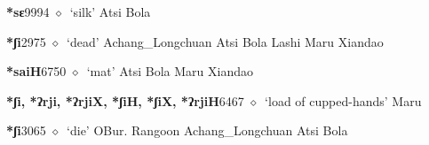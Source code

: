   \begin{list}{}{\leftmargin=1.5em \itemindent=-1.5em}
  \item {\footnotesize \textbf{*sɛ}}{\tiny 9994}
         $\diamond$~`silk'
         Atsi 
\hspace{1ex}
         Bola 
  \item {\footnotesize \textbf{*ʃi}}{\tiny 2975}
\hspace{1ex}
         $\diamond$~`dead'
         Achang\_Longchuan 
\hspace{1ex}
         Atsi 
\hspace{1ex}
         Bola 
\hspace{1ex}
         Lashi 
\hspace{1ex}
         Maru 
\hspace{1ex}
         Xiandao 
  \item {\footnotesize \textbf{*saiH}}{\tiny 6750}
\hspace{1ex}
         $\diamond$~`mat'
         Atsi 
\hspace{1ex}
         Bola 
\hspace{1ex}
         Maru 
\hspace{1ex}
         Xiandao 
  \item {\footnotesize \textbf{*ʃi, *ʔrji, *ʔrjiX, *ʃiH, *ʃiX, *ʔrjiH}}{\tiny 6467}
\hspace{1ex}
         $\diamond$~`load of cupped-hands'
         Maru 
  \item {\footnotesize \textbf{*ʃi}}{\tiny 3065}
\hspace{1ex}
         $\diamond$~`die'
         OBur. 
\hspace{1ex}
         Rangoon 
\hspace{1ex}
         Achang\_Longchuan 
\hspace{1ex}
         Atsi 
\hspace{1ex}
         Bola 

\end{list}
